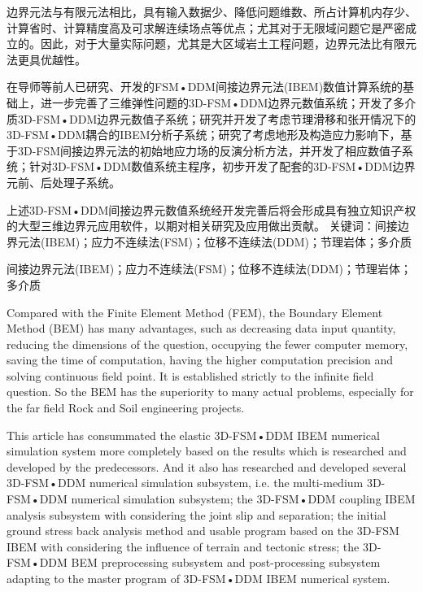 
\newpage\thispagestyle{empty}
\begin{center}{\bfseries\xiaoer{}}\end{center}

边界元法与有限元法相比，具有输入数据少、降低问题维数、所占计算机内存少、计算省时、计算精度高及可求解连续场点等优点；尤其对于无限域问题它是严密成立的。因此，对于大量实际问题，尤其是大区域岩土工程问题，边界元法比有限元法更具优越性。

在导师等前人已研究、开发的FSM•DDM间接边界元法(IBEM)数值计算系统的基础上，进一步完善了三维弹性问题的3D-FSM•DDM边界元数值系统；开发了多介质3D-FSM•DDM边界元数值子系统；研究并开发了考虑节理滑移和张开情况下的3D-FSM•DDM耦合的IBEM分析子系统；研究了考虑地形及构造应力影响下，基于3D-FSM间接边界元法的初始地应力场的反演分析方法，并开发了相应数值子系统；针对3D-FSM•DDM数值系统主程序，初步开发了配套的3D-FSM•DDM边界元前、后处理子系统。

上述3D-FSM•DDM间接边界元数值系统经开发完善后将会形成具有独立知识产权的大型三维边界元应用软件，以期对相关研究及应用做出贡献。
关键词：间接边界元法(IBEM)；应力不连续法(FSM)；位移不连续法(DDM)；节理岩体；多介质

{\bfseries\xiaosi{}}间接边界元法(IBEM)；应力不连续法(FSM)；位移不连续法(DDM)；节理岩体；多介质


\clearpage

\newpage\thispagestyle{empty}
\begin{center}{\bfseries{}}\end{center}

Compared with the Finite Element Method (FEM), the Boundary Element Method (BEM) has many advantages, such as decreasing data input quantity, reducing the dimensions of the question, occupying the fewer computer memory, saving the time of computation, having the higher computation precision and solving continuous field point. It is established strictly to the infinite field question. So the BEM has the superiority to many actual problems, especially for the far field Rock and Soil engineering projects.

This article has consummated the elastic 3D-FSM•DDM IBEM numerical simulation system more completely based on the results which is researched and developed by the predecessors. And it also has researched and developed several 3D-FSM•DDM numerical simulation subsystem, i.e. the multi-medium 3D-FSM•DDM numerical simulation subsystem; the 3D-FSM•DDM coupling IBEM analysis subsystem with considering the joint slip and separation; the initial ground stress back analysis method and usable program based on the 3D-FSM IBEM with considering the influence of terrain and tectonic stress; the 3D-FSM•DDM BEM preprocessing subsystem and post-processing subsystem adapting to the master program of 3D-FSM•DDM IBEM numerical system. 

